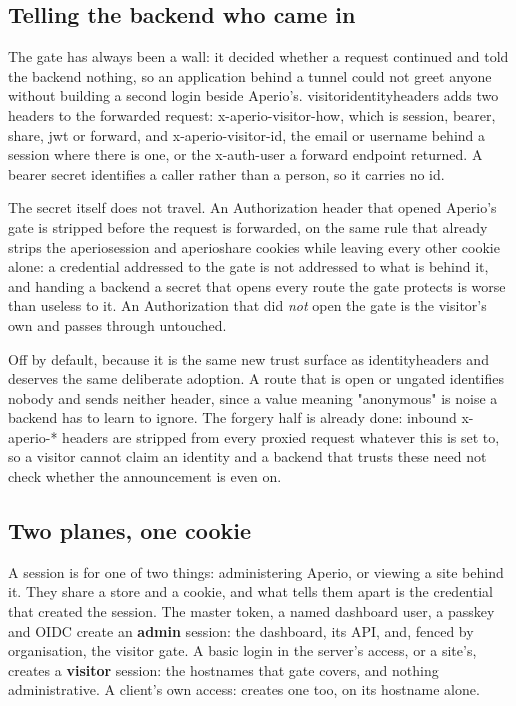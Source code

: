 \documentclass[11pt,a4paper,oneside]{book}
\newcommand{\aperiobreakableunderscore}{\textunderscore\allowbreak}
\newcommand{\aperiocodebreaks}{\XeTeXinterchartokenstate=1 }
\newcommand{\aperiocodebreaks}{}
\DeclareRobustCommand{\code}[1]{{\ttfamily\small\aperiocodebreaks
  \let\_\aperiobreakableunderscore#1}}
\begin{document}
\subsection{Telling the backend who came in}

The gate has always been a wall: it decided whether a request continued
and told the backend nothing, so an application behind a tunnel could not
greet anyone without building a second login beside Aperio's.
\code{visitor\_identity\_headers} adds two headers to the forwarded
request: \code{x-aperio-visitor-how}, which is \code{session},
\code{bearer}, \code{share}, \code{jwt} or \code{forward}, and
\code{x-aperio-visitor-id}, the email
or username behind a session where there is one, or the \code{x-auth-user}
a \code{forward} endpoint returned. A \code{bearer} secret
identifies a caller rather than a person, so it carries no id.

The secret itself does not travel. An \code{Authorization} header that
opened Aperio's gate is stripped before the request is forwarded, on the
same rule that already strips the \code{aperio\_session} and
\code{aperio\_share} cookies while leaving every other cookie alone: a
credential addressed to the gate is not addressed to what is behind it,
and handing a backend a secret that opens every route the gate protects
is worse than useless to it. An \code{Authorization} that did \emph{not}
open the gate is the visitor's own and passes through untouched.

Off by default, because it is the same new trust surface as
\code{identity\_headers} and deserves the same deliberate adoption. A
route that is open or ungated identifies nobody and sends neither header,
since a value meaning "anonymous" is noise a backend has to learn to
ignore. The forgery half is already done: inbound \code{x-aperio-*}
headers are stripped from every proxied request whatever this is set to,
so a visitor cannot claim an identity and a backend that trusts these
need not check whether the announcement is even on.

\subsection{Two planes, one cookie}
\label{sec:two-planes}

A session is for one of two things: administering Aperio, or viewing a
site behind it. They share a store and a cookie, and what tells them
apart is the credential that created the session. The master token, a
named dashboard user, a passkey and OIDC create an \textbf{admin}
session: the dashboard, its API, and, fenced by organisation, the
visitor gate. A \code{basic} login in the server's \code{access}, or a
site's, creates a \textbf{visitor} session: the hostnames that gate
covers, and nothing administrative. A client's own \code{access:} creates
one too, on its hostname alone.
\end{document}
